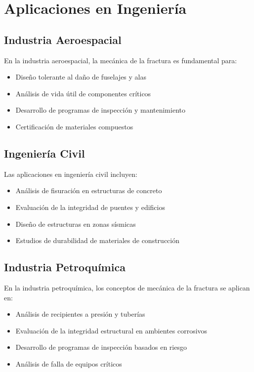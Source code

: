 \documentclass[12pt,letterpaper]{article}
\begin{document}
\section{Aplicaciones en Ingeniería}

\subsection{Industria Aeroespacial}

En la industria aeroespacial, la mecánica de la fractura es fundamental para:
\begin{itemize}
\item Diseño tolerante al daño de fuselajes y alas
\item Análisis de vida útil de componentes críticos
\item Desarrollo de programas de inspección y mantenimiento
\item Certificación de materiales compuestos
\end{itemize}

\subsection{Ingeniería Civil}

Las aplicaciones en ingeniería civil incluyen:
\begin{itemize}
\item Análisis de fisuración en estructuras de concreto
\item Evaluación de la integridad de puentes y edificios
\item Diseño de estructuras en zonas sísmicas
\item Estudios de durabilidad de materiales de construcción
\end{itemize}

\subsection{Industria Petroquímica}

En la industria petroquímica, los conceptos de mecánica de la fractura se aplican en:
\begin{itemize}
\item Análisis de recipientes a presión y tuberías
\item Evaluación de la integridad estructural en ambientes corrosivos
\item Desarrollo de programas de inspección basados en riesgo
\item Análisis de falla de equipos críticos
\end{itemize}
\end{document}
